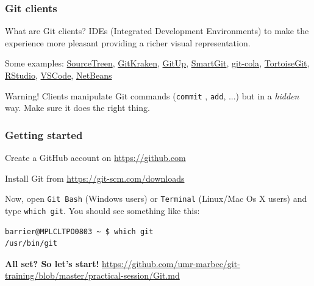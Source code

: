 \documentclass[svgnames]{beamer}
\begin{document}
\begin{frame}[fragile]
    \frametitle{Git clients}

	\begin{block}{What are Git clients?}
    IDEs (Integrated Development Environments) to make the experience more pleasant providing a richer visual representation.\\
    \end{block}
    \hfill

Some examples:
\href{https://www.sourcetreeapp.com/}{SourceTreen}, 
\href{https://www.gitkraken.com/}{GitKraken},
\href{https://gitup.co/}{GitUp},
\href{https://www.syntevo.com/smartgit/}{SmartGit}, 
\href{https://git-cola.github.io/}{git-cola}, 
\href{https://tortoisegit.org/}{TortoiseGit},
\href{https://www.rstudio.com/}{RStudio},
\href{https://code.visualstudio.com/}{VSCode},
\href{https://netbeans.apache.org/}{NetBeans}\\

\hfill

\begin{alertblock}{Warning!}
Clients manipulate Git commands (\verb+commit+ , \verb+add+, ...) but in a \emph{hidden} way. 
Make sure it does the right thing.
\end{alertblock}

\end{frame}

\begin{frame}[fragile]
\frametitle{Getting started}

Create a GitHub account on \url{https://github.com}\\
\hfill

Install Git from \url{https://git-scm.com/downloads}\\
\hfill




Now, open \verb+Git Bash+ (Windows users) or \verb+Terminal+ (Linux/Mac Os X users) and type \verb+which git+. You should see something like this:

\begin{verbatim}
barrier@MPLCLTPO0803 ~ $ which git
/usr/bin/git
\end{verbatim}

\textbf{All set? So let's start!}
\url{https://github.com/umr-marbec/git-training/blob/master/practical-session/Git.md}

\end{frame}
\end{document}
